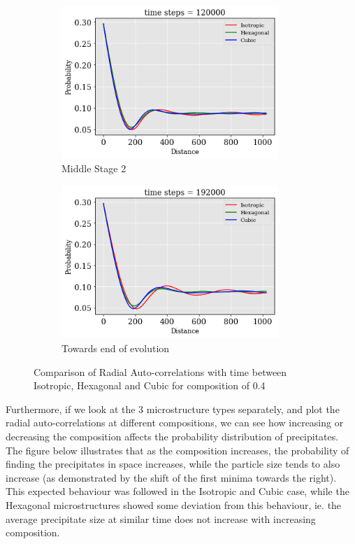 \documentclass[12pt, a4paper]{report}
\begin{document}
\begin{figure}[H]
\begin{subfigure}{.45\textwidth}
  \centering
  \includegraphics[width=0.9\textwidth]{Pictures/Comparison/Radial Auto comparison/rad_120000.png}
  \caption{Middle Stage 2}
  \label{img:microstrImg}
\end{subfigure}
\begin{subfigure}{.45\textwidth}
  \centering
  \includegraphics[width=0.9\textwidth]{Pictures/Comparison/Radial Auto comparison/rad_19200.png}
  \caption{Towards end of evolution}
  \label{img:microstrImg}
\end{subfigure}
\caption{Comparison of Radial Auto-correlations with time between Isotropic, Hexagonal and Cubic for composition of 0.4}
\label{fig:test22}
\end{figure}
Furthermore, if we look at the 3 microstructure types separately, and plot the radial auto-correlations at different compositions, we can see how increasing or decreasing the composition affects the probability distribution of precipitates. The figure below illustrates that as the composition increases, the probability of finding the precipitates in space increases, while the particle size tends to also increase (as demonstrated by the shift of the first minima towards the right). This expected behaviour was followed in the Isotropic and Cubic case, while the Hexagonal microstructures showed some deviation from this behaviour, ie. the average precipitate size at similar time does not increase with increasing composition.
\end{document}
